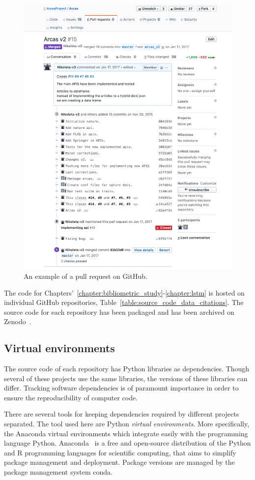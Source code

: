 \begin{figure}[!hbtp]
    \centering
    \includegraphics[width=.8\textwidth]{src/chapters/01/img/GitHub_discussion}
    \caption{An example of a pull request on GitHub.}\label{fig:pull_request_github}
\end{figure}

The code for Chapters'~\ref{chapter:bibliometric_study}-\ref{chapter:lstm} is
hosted on individual GitHub repositories,
Table~\ref{table:source_code_data_citations}. The source code for each
repository has been packaged and has been archived on Zenodo~\cite{zenodo}.

\subsection{Virtual environments}

The source code of each repository has Python libraries as dependencies. Though
several of these projects use the same libraries, the versions of these
libraries can differ. Tracking software dependencies is of paramount importance
in order to ensure the reproducibility of computer code.

There are several tools for keeping dependencies required by different projects
separated. The tool used here are Python \textit{virtual environments}. More
specifically, the Anaconda virtual environments which integrate easily with the
programming language Python. Anaconda~\cite{anaconda} is a free and open-source distribution of
the Python and R programming languages for scientific computing, that aims to
simplify package management and deployment. Package versions are managed by the
package management system conda.

